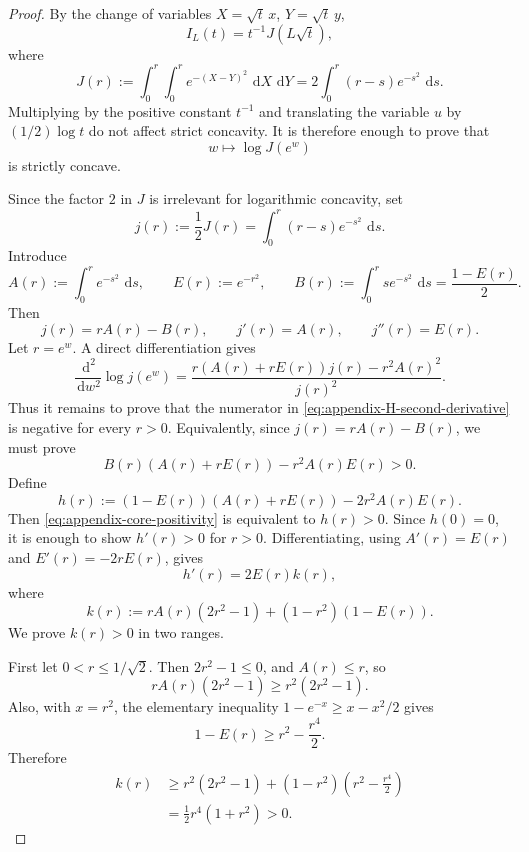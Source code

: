 \documentclass[10pt,a4paper]{amsart}
\newcommand{\dd}{\,\mathrm{d}}
\begin{document}
\begin{proof}
By the change of variables \(X=\sqrt t\,x\), \(Y=\sqrt t\,y\),
\[
    I_L(t)=t^{-1}J(L\sqrt t),
\]
where
\[
    J(r):=\int_0^r\int_0^r e^{-(X-Y)^2}\,\dd X\,\dd Y
    =2\int_0^r(r-s)e^{-s^2}\,\dd s.
\]
Multiplying by the positive constant \(t^{-1}\) and translating the variable
\(u\) by \((1/2)\log t\) do not affect strict concavity.  It is therefore
enough to prove that
\[
    w\longmapsto \log J(e^w)
\]
is strictly concave.

Since the factor \(2\) in \(J\) is irrelevant for logarithmic concavity, set
\[
    j(r):=\frac{1}{2}J(r)=\int_0^r(r-s)e^{-s^2}\,\dd s.
\]
Introduce
\[
    A(r):=\int_0^r e^{-s^2}\,\dd s,
    \qquad
    E(r):=e^{-r^2},
    \qquad
    B(r):=\int_0^r s e^{-s^2}\,\dd s=\frac{1-E(r)}{2}.
\]
Then
\[
    j(r)=rA(r)-B(r),
    \qquad
    j'(r)=A(r),
    \qquad
    j''(r)=E(r).
\]
Let \(r=e^w\).  A direct differentiation gives
\begin{equation}
    \frac{\dd^2}{\dd w^2}\log j(e^w)
    =
    \frac{r(A(r)+rE(r))j(r)-r^2A(r)^2}{j(r)^2}.
    \label{eq:appendix-H-second-derivative}
\end{equation}
Thus it remains to prove that the numerator in
\eqref{eq:appendix-H-second-derivative} is negative for every \(r>0\).
Equivalently, since \(j(r)=rA(r)-B(r)\), we must prove
\begin{equation}
    B(r)(A(r)+rE(r))-r^2A(r)E(r)>0.
    \label{eq:appendix-core-positivity}
\end{equation}
Define
\[
    h(r):=(1-E(r))(A(r)+rE(r))-2r^2A(r)E(r).
\]
Then \eqref{eq:appendix-core-positivity} is equivalent to \(h(r)>0\).  Since
\(h(0)=0\), it is enough to show \(h'(r)>0\) for \(r>0\).  Differentiating,
using \(A'(r)=E(r)\) and \(E'(r)=-2rE(r)\), gives
\begin{equation}
    h'(r)=2E(r)k(r),
    \label{eq:appendix-h-prime}
\end{equation}
where
\begin{equation}
    k(r):=rA(r)(2r^2-1)+(1-r^2)(1-E(r)).
    \label{eq:appendix-k-definition}
\end{equation}
We prove \(k(r)>0\) in two ranges.

First let \(0<r\leq 1/\sqrt2\).  Then \(2r^2-1\leq0\), and
\(A(r)\leq r\), so
\[
    rA(r)(2r^2-1)
    \geq
    r^2(2r^2-1).
\]
Also, with \(x=r^2\), the elementary inequality
\(1-e^{-x}\geq x-x^2/2\) gives
\[
    1-E(r)\geq r^2-\frac{r^4}{2}.
\]
Therefore
\[
\begin{split}
    k(r)
    &\geq
    r^2(2r^2-1)
    +(1-r^2)\left(r^2-\frac{r^4}{2}\right)  \\
    &=
    \frac12 r^4(1+r^2)>0.
\end{split}
\]


\end{proof}
\end{document}
